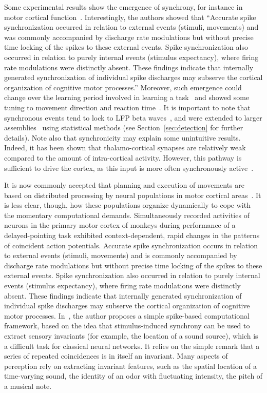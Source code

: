 \documentclass[brainsci, %
               review,submit,pdftex,moreauthors%
               ]{Definitions/mdpi}
\begin{document}
%
Some experimental results show the emergence of synchrony, for instance in motor cortical function~\citep{riehle_spike_1997}. Interestingly, the authors showed that ``Accurate spike synchronization occurred in relation to external events (stimuli, movements) and was commonly accompanied by discharge rate modulations but without precise time locking of the spikes to these external events. Spike synchronization also occurred in relation to purely internal events (stimulus expectancy), where firing rate modulations were distinctly absent. These findings indicate that internally generated synchronization of individual spike discharges may subserve the cortical organization of cognitive motor processes.'' Moreover, such emergence could change over the learning period involved in learning a task~\citep{kilavik_long-term_2009} and showed some tuning to movement direction and reaction time~\citep{grammont_spike_2003}. It is important to note that synchronous events tend to lock to LFP beta waves~\citep{denker_lfp_2018}, and were extended to larger assemblies~\citep{torre_synchronous_2016} using statistical methods (see Section~\ref{sec:detection} for further details). Note also that synchronicity may explain some unintuitive results. Indeed, it has been shown that thalamo-cortical synapses are relatively weak compared to the amount of intra-cortical activity. However, this pathway is sufficient to drive the cortex, as this input is more often synchronously active~\citep{bruno_cortex_2006}. 

It is now commonly accepted that planning and execution of movements are based on distributed processing by neural populations in motor cortical areas~\citep{riehle_spike_1997,grammont_precise_1999}. It is less clear, though, how these populations organize dynamically to cope with the momentary computational demands. Simultaneously recorded activities of neurons in the primary motor cortex of monkeys during performance of a delayed-pointing task exhibited context-dependent, rapid changes in the patterns of coincident action potentials. Accurate spike synchronization occurs in relation to external events (stimuli, movements) and is commonly accompanied by discharge rate modulations but without precise time locking of the spikes to these external events. Spike synchronization also occurred in relation to purely internal events (stimulus expectancy), where firing rate modulations were distinctly absent. These findings indicate that internally generated synchronization of individual spike discharges may subserve the cortical organization of cognitive motor processes. In~\citep{brette_computing_2012}, the author proposes a simple spike-based computational framework, based on the idea that stimulus-induced synchrony can be used to extract sensory invariants (for example, the location of a sound source), which is a difficult task for classical neural networks. It relies on the simple remark that a series of repeated coincidences is in itself an invariant. Many aspects of perception rely on extracting invariant features, such as the spatial location of a time-varying sound, the identity of an odor with fluctuating intensity, the pitch of a musical note.
\end{document}
